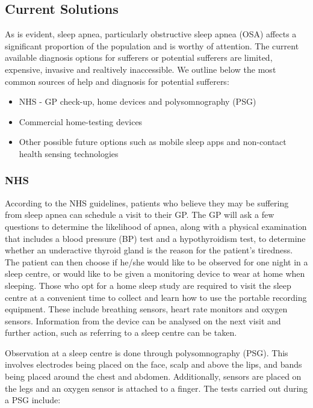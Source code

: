 \subsection{Current Solutions}

	As is evident, sleep apnea, particularly obstructive sleep apnea (OSA)
affects a significant proportion of the population and is worthy of
attention. The current available diagnosis options for sufferers or
potential sufferers are limited, expensive, invasive and realtively
inaccessible. We outline below the most common sources of help and
diagnosis for potential sufferers:
	\begin{itemize}
	\item NHS - GP check-up, home devices and polysomnography (PSG)
	\item Commercial home-testing devices
	\item Other possible future options such as mobile sleep apps and non-contact
health sensing technologies
	\end{itemize}

\subsubsection{NHS}

According to the NHS guidelines, patients who believe they may be
suffering from sleep apnea can schedule a visit to their GP. The GP
will ask a few questions to determine the likelihood of apnea, along
with a physical examination that includes a blood pressure (BP) test
and a hypothyroidism test, to determine whether an underactive thyroid
gland is the reason for the patient's tiredness. The patient can then
choose if he/she would like to be observed for one night in a sleep
centre, or would like to be given a monitoring device to wear at home
when sleeping. Those who opt for a home sleep study are required to
visit the sleep centre at a convenient time to collect and learn how
to use the portable recording equipment. These include breathing sensors,
heart rate monitors and oxygen sensors. Information from the device
can be analysed on the next visit and further action, such as referring
to a sleep centre can be taken.

Observation at a sleep centre is done through polysomnography (PSG).
This involves electrodes being placed on the face, scalp and above
the lips, and bands being placed around the chest and abdomen. Additionally,
sensors are placed on the legs and an oxygen sensor is attached to
a finger. The tests carried out during a PSG include:

